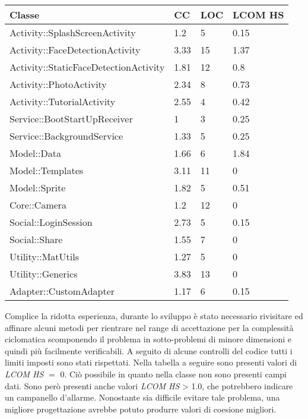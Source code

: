 \begin{center}
    \begin{longtable}{ | p{6cm} | p{1.5cm} | p{1.5cm} | p{1.8cm} |}
    \hline
    Classe & CC & LOC & LCOM HS \\ \hline
    Activity::SplashScreenActivity& 1.2 & 5 & 0.15\\ \hline 
    Activity::FaceDetectionActivity& 3.33 & 15& 1.37\\ \hline 
    Activity::StaticFaceDetectionActivity& 1.81 & 12 & 0.8\\ \hline 
    Activity::PhotoActivity& 2.34 & 8 & 0.73\\ \hline 
    Activity::TutorialActivity& 2.55 & 4  & 0.42\\ \hline 
    Service::BootStartUpReceiver & 1 & 3 & 0.25\\ \hline 
    Service::BackgroundService & 1.33 & 5 & 0.25\\ \hline 
    Model::Data& 1.66 &  6  & 1.84\\ \hline 
    Model::Templates& 3.11 & 11  & 0\\ \hline 
    Model::Sprite& 1.82 & 5  & 0.51\\ \hline 
    Core::Camera& 1.2 & 12 & 0\\ \hline 
    Social::LoginSession& 2.73 & 5 & 0.15\\ \hline 
    Social::Share& 1.55 & 7 & 0\\ \hline 
    Utility::MatUtils& 1.27 & 5 & 0\\ \hline 
	Utility::Generics& 3.83 & 13 & 0\\ \hline 
	Adapter::CustomAdapter& 1.17 & 6 & 0.15\\ \hline     
    


    \end{longtable}
\end{center}

Complice la ridotta esperienza, durante lo sviluppo è stato necessario rivisitare ed affinare alcuni metodi per rientrare nel range di accettazione per la complessità ciclomatica scomponendo il problema in sotto-problemi di minore dimensioni e quindi più facilmente verificabili. A seguito di alcune controlli del codice tutti i limiti imposti sono stati rispettati.
Nella tabella a seguire sono presenti valori di \textit{LCOM HS} $=$ 0. Ciò possibile in quanto nella classe non sono presenti campi dati. Sono però presenti anche valori \textit{LCOM HS} > 1.0, che potrebbero indicare un campanello d'allarme. Nonostante sia difficile evitare tale problema, una migliore progettazione avrebbe potuto produrre valori di coesione migliori.


